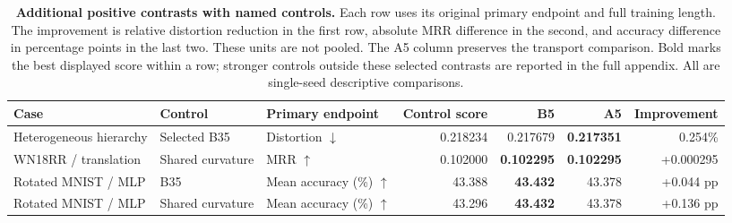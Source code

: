 \begin{table}[t]
\centering
\caption{\textbf{Additional positive contrasts with named controls.} Each row uses its original primary endpoint and full training length. The improvement is relative distortion reduction in the first row, absolute MRR difference in the second, and accuracy difference in percentage points in the last two. These units are not pooled. The A5 column preserves the transport comparison. Bold marks the best displayed score within a row; stronger controls outside these selected contrasts are reported in the full appendix. All are single-seed descriptive comparisons.}
\label{tab:positive-narrow-contrasts}
\footnotesize\setlength{\tabcolsep}{5pt}\renewcommand{\arraystretch}{1.12}
\begin{adjustbox}{max width=\linewidth}
\begin{tabular}{lllrrrr}
\toprule
Case & Control & Primary endpoint & Control score & B5 & A5 & Improvement \\
\midrule
Heterogeneous hierarchy & Selected B35 & Distortion $\downarrow$ & 0.218234 & \cellcolor{oursbg}0.217679 & \textbf{0.217351} & 0.254\% \\
WN18RR / translation & Shared curvature & MRR $\uparrow$ & 0.102000 & \cellcolor{oursbg}\textbf{0.102295} & \textbf{0.102295} & +0.000295 \\
Rotated MNIST / MLP & B35 & Mean accuracy (\%) $\uparrow$ & 43.388 & \cellcolor{oursbg}\textbf{43.432} & 43.378 & +0.044 pp \\
Rotated MNIST / MLP & Shared curvature & Mean accuracy (\%) $\uparrow$ & 43.296 & \cellcolor{oursbg}\textbf{43.432} & 43.378 & +0.136 pp \\
\bottomrule
\end{tabular}
\end{adjustbox}
\end{table}
